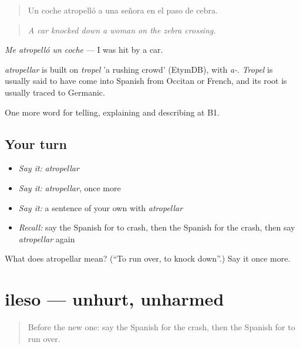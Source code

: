 \begin{quote}
Un coche atropelló a una señora en el paso de cebra.
\end{quote}

\begin{quote}
\emph{A car knocked down a woman on the zebra crossing.}
\end{quote}

\emph{Me atropelló un coche} — I was hit by a car.

\begin{cousinweb}
\emph{atropellar} is built on \emph{tropel} 'a rushing crowd' (EtymDB), with \emph{a-}. \emph{Tropel} is usually said to have come into Spanish from Occitan or French, and its root is usually traced to Germanic.
\end{cousinweb}

\begin{grammarlens}[title={What you've built}]
One more word for telling, explaining and describing at B1.
\end{grammarlens}

\subsection*{Your turn}
\begin{itemize}
\raggedright
  \item \emph{Say it:} \emph{atropellar}
  \item \emph{Say it:} \emph{atropellar}, once more
  \item \emph{Say it:} a sentence of your own with \emph{atropellar}
  \item \emph{Recall:} say the Spanish for to crash, then the Spanish for the crash, then say \emph{atropellar} again
\end{itemize}

\begin{tcolorbox}[breakable,colback=teal!4,colframe=teal!35!black,title={Before you move on}]
What does atropellar mean? (\textquotedblleft{}To run over, to knock down\textquotedblright{}.) Say it once more.
\end{tcolorbox}
\section[ileso]{ileso — unhurt, unharmed}

\label{lesson:ES-C527-ileso}



\begin{quote}
Before the new one: say the Spanish for the crash, then the Spanish for to run over.
\end{quote}

